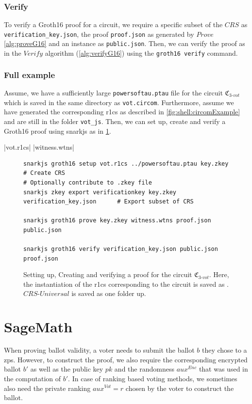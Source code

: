 \subsubsection{Verify}
To verify a Groth16 proof for a circuit, we require a specific subset of the $CRS$ as \verb|verification_key.json|, the proof \verb|proof.json| as generated by $Prove$ \cref{alg:proveG16} and an instance as \verb|public.json|.
Then, we can verify the proof as in the $Verify$ algorithm (\cref{alg:verifyG16}) using the \verb|groth16 verify| command.

\subsubsection{Full example}
Assume, we have a sufficiently large \verb|powersoftau.ptau| file for the circuit $\mathfrak{C}_{3\text{-}vot}$ which is saved in the same directory as \verb|vot.circom|.
Furthermore, assume we have generated the corresponding \gls{r1cs} as described in \cref{fig:shell:circomExample} and are still in the folder \verb|vot_js|.
Then, we can set up, create and verify a Groth16 proof using snarkjs as in \cref{fig:shell:snarkjsExample}.

|vot.r1cs|
|witness.wtns|
\begin{figure}[h]
    \centering
    \captionsetup{type=listing}
\begin{lstlisting}[language=Shell]
snarkjs groth16 setup vot.r1cs ../powersoftau.ptau key.zkey             # Create CRS
# Optionally contribute to .zkey file
snarkjs zkey export verificationkey key.zkey verification_key.json      # Export subset of CRS

snarkjs groth16 prove key.zkey witness.wtns proof.json public.json      

snarkjs groth16 verify verification_key.json public.json proof.json     
\end{lstlisting}
    \caption{Setting up, Creating and verifying a proof for the circuit $\mathfrak{C}_{3\text{-}vot}$.
    Here, the instantiation of the \gls{r1cs} \protect{} corresponding to the circuit is saved as .
    $CRS\text{-}Universal$ is saved as  one folder up.
    }
    \label{fig:shell:snarkjsExample}
\end{figure}

\section{SageMath}
When proving ballot validity, a voter needs to submit the ballot $b$ they chose to a \gls{zps}.
However, to construct the proof, we also require the corresponding encrypted ballot $b'$ as well as the public key $pk$ and the randomness $aux^{Enc}$ that was used in the computation of $b'$.
In case of ranking based voting methods, we sometimes also need the private ranking $aux^{Vot}=r$ chosen by the voter to construct the ballot.

